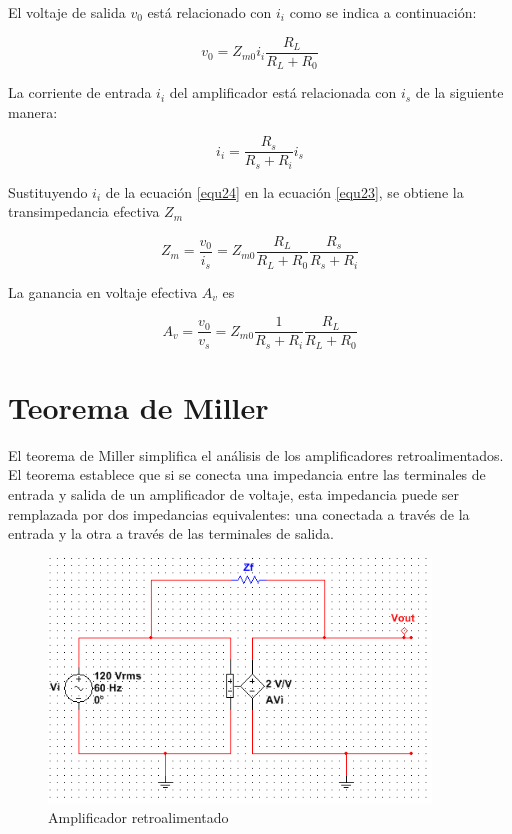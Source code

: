 \documentclass[12pt]{book}
\theoremstyle{definition}
\theoremstyle{remark}
\theoremstyle{plain}
\begin{document}
El voltaje de salida $v_0$ está relacionado con $i_i$ como se indica a continuación:

\begin{equation}
\label{equ23}
v_0 = Z_{m 0} i_i \frac{R_L}{R_L+R_0}
\end{equation}

La corriente de entrada $i_i$ del amplificador está relacionada con $i_s$ de la siguiente manera:

\begin{equation}
\label{equ24}
i_i = \frac{R_s}{R_s+R_i} i_s
\end{equation}

Sustituyendo $i_i$ de la ecuación \ref{equ24} en la ecuación \ref{equ23}, se obtiene la transimpedancia efectiva $Z_m$

\begin{equation}
\label{equ25}
Z_m = \frac{v_0}{i_s}= Z_{m 0} \frac{R_L}{R_L+R_0} \frac{R_s}{R_s+R_i}
\end{equation}


La ganancia en voltaje efectiva $A_v$ es

\begin{equation}
\label{equ26}
A_v = \frac{v_0}{v_s} = Z_{m 0} \frac{1}{R_s+R_i} \frac{R_L}{R_L+R_0}
\end{equation}

\section{Teorema de Miller}

El teorema de Miller simplifica el análisis de los amplificadores retroalimentados. El teorema establece que si se conecta una impedancia entre las terminales de entrada y salida de un amplificador de voltaje, esta impedancia puede ser remplazada por dos impedancias equivalentes: una conectada a través de la entrada y la otra a través de las terminales de salida. 

\begin{figure}
\centering
\includegraphics[width=4in]{AmplificadorMiller.png}
\caption{Amplificador retroalimentado}
\label{fig1000}
\end{figure}
\end{document}
